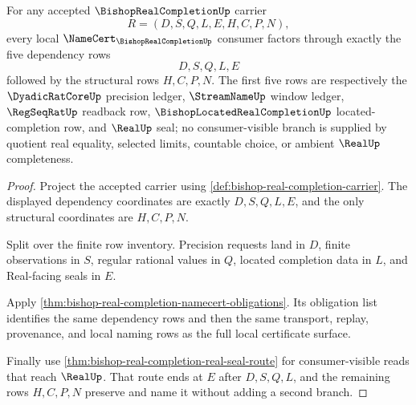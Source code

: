\begin{theorem}
\label{thm:bishop-real-completion-local-namecert-exhaustion}
For any accepted $\BishopRealCompletionUp$ carrier
$$
R=(D,S,Q,L,E,H,C,P,N),
$$
every local $\NameCert_{\BishopRealCompletionUp}$ consumer factors through exactly the five dependency rows
$$
D,S,Q,L,E
$$
followed by the structural rows $H,C,P,N$. The first five rows are respectively the $\DyadicRatCoreUp$ precision ledger, $\StreamNameUp$ window ledger, $\RegSeqRatUp$ readback row, $\BishopLocatedRealCompletionUp$ located-completion row, and $\RealUp$ seal; no consumer-visible branch is supplied by quotient real equality, selected limits, countable choice, or ambient $\RealUp$ completeness.
\end{theorem}
\begin{proof}
Project the accepted carrier using \autoref{def:bishop-real-completion-carrier}. The displayed dependency coordinates are exactly $D,S,Q,L,E$, and the only structural coordinates are $H,C,P,N$.

Split over the finite row inventory. Precision requests land in $D$, finite observations in $S$, regular rational values in $Q$, located completion data in $L$, and Real-facing seals in $E$.

Apply \autoref{thm:bishop-real-completion-namecert-obligations}. Its obligation list identifies the same dependency rows and then the same transport, replay, provenance, and local naming rows as the full local certificate surface.

Finally use \autoref{thm:bishop-real-completion-real-seal-route} for consumer-visible reads that reach $\RealUp$. That route ends at $E$ after $D,S,Q,L$, and the remaining rows $H,C,P,N$ preserve and name it without adding a second branch.
\end{proof}


\begin{closurestatus}{\BishopRealCompletionUp}
  \theoryclosure{\seedClosure}
  \formalstatus{\unformalizedV}
\end{closurestatus}
